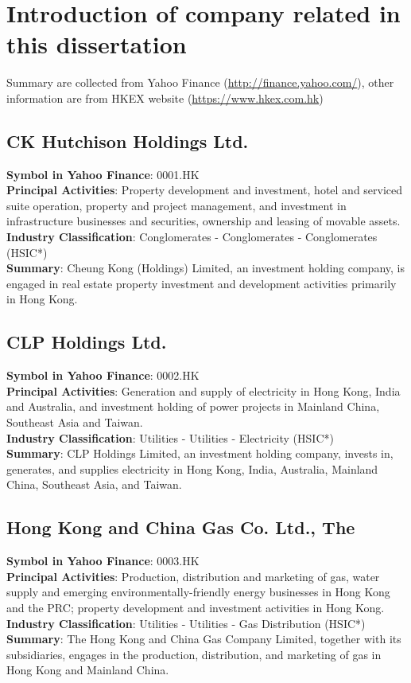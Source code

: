 \chapter{Introduction of company related in this dissertation}
\label{append:stock_info}

Summary are collected from Yahoo Finance (\url{http://finance.yahoo.com/}), other information are from HKEX website (\url{https://www.hkex.com.hk})

\section{CK Hutchison Holdings Ltd.}
\textbf{Symbol in Yahoo Finance}: 0001.HK\\
\textbf{Principal Activities}: Property development and investment, hotel and serviced suite operation, property and project management, and investment in infrastructure businesses and securities, ownership and leasing of movable assets.\\
\textbf{Industry Classification}: Conglomerates - Conglomerates - Conglomerates (HSIC*)\\
\textbf{Summary}: Cheung Kong (Holdings) Limited, an investment holding company, is engaged in real estate property investment and development activities primarily in Hong Kong.


\section{CLP Holdings Ltd.}
\textbf{Symbol in Yahoo Finance}: 0002.HK\\
\textbf{Principal Activities}: Generation and supply of electricity in Hong Kong, India and Australia, and investment holding of power projects in Mainland China, Southeast Asia and Taiwan.\\
\textbf{Industry Classification}: Utilities - Utilities - Electricity (HSIC*)\\
\textbf{Summary}: CLP Holdings Limited, an investment holding company, invests in, generates, and supplies electricity in Hong Kong, India, Australia, Mainland China, Southeast Asia, and Taiwan.


\section{Hong Kong and China Gas Co. Ltd., The}
\textbf{Symbol in Yahoo Finance}: 0003.HK\\
\textbf{Principal Activities}: Production, distribution and marketing of gas, water supply and emerging environmentally-friendly energy businesses in Hong Kong and the PRC; property development and investment activities in Hong Kong.\\
\textbf{Industry Classification}: Utilities - Utilities - Gas Distribution (HSIC*)\\
\textbf{Summary}: The Hong Kong and China Gas Company Limited, together with its subsidiaries, engages in the production, distribution, and marketing of gas in Hong Kong and Mainland China.


